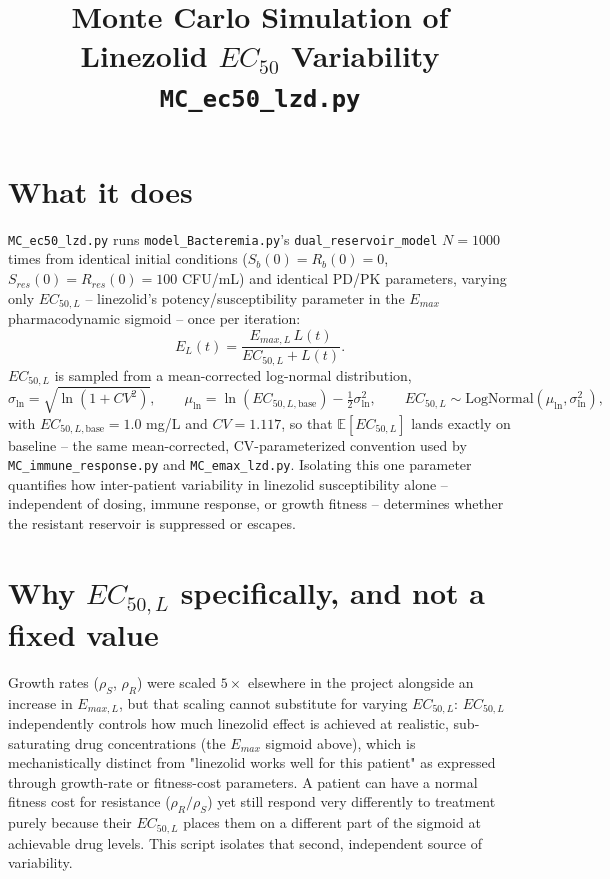 \documentclass[11pt]{article}
\title{Monte Carlo Simulation of Linezolid $EC_{50}$ Variability\\
\large \texttt{MC\_ec50\_lzd.py}}
\author{}
\date{}
\begin{document}
\maketitle

\section{What it does}

\texttt{MC\_ec50\_lzd.py} runs \texttt{model\_Bacteremia.py}'s
\texttt{dual\_reservoir\_model} $N = 1000$ times from identical initial
conditions ($S_b(0){=}R_b(0){=}0$, $S_{res}(0){=}R_{res}(0){=}100$ CFU/mL) and
identical PD/PK parameters, varying only $EC_{50,L}$ -- linezolid's
potency/susceptibility parameter in the $E_{max}$ pharmacodynamic sigmoid --
once per iteration:
\begin{equation}
E_L(t) = \frac{E_{max,L}\, L(t)}{EC_{50,L} + L(t)}.
\end{equation}
$EC_{50,L}$ is sampled from a mean-corrected log-normal distribution,
\begin{equation}
\sigma_{\ln} = \sqrt{\ln(1+CV^2)}, \qquad
\mu_{\ln} = \ln(EC_{50,L,\mathrm{base}}) - \tfrac{1}{2}\sigma_{\ln}^2, \qquad
EC_{50,L} \sim \mathrm{LogNormal}(\mu_{\ln}, \sigma_{\ln}^2),
\end{equation}
with $EC_{50,L,\mathrm{base}} = 1.0$ mg/L and $CV = 1.117$, so that
$\mathbb{E}[EC_{50,L}]$ lands exactly on baseline -- the same
mean-corrected, CV-parameterized convention used by
\texttt{MC\_immune\_response.py} and \texttt{MC\_emax\_lzd.py}. Isolating
this one parameter quantifies how inter-patient variability in linezolid
susceptibility alone -- independent of dosing, immune response, or growth
fitness -- determines whether the resistant reservoir is suppressed or
escapes.

\section{Why $EC_{50,L}$ specifically, and not a fixed value}

Growth rates ($\rho_S$, $\rho_R$) were scaled $5\times$ elsewhere in the
project alongside an increase in $E_{max,L}$, but that scaling cannot
substitute for varying $EC_{50,L}$: $EC_{50,L}$ independently controls how
much linezolid effect is achieved at realistic, sub-saturating drug
concentrations (the $E_{max}$ sigmoid above), which is mechanistically
distinct from "linezolid works well for this patient" as expressed through
growth-rate or fitness-cost parameters. A patient can have a normal fitness
cost for resistance ($\rho_R/\rho_S$) yet still respond very differently to
treatment purely because their $EC_{50,L}$ places them on a different part of
the sigmoid at achievable drug levels. This script isolates that second,
independent source of variability.
\end{document}
